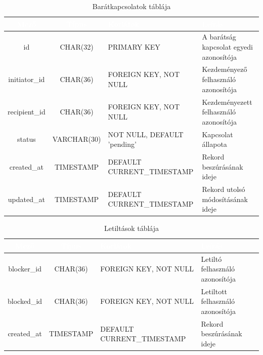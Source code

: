 \documentclass[12pt]{report}
\begin{document}
\begin{table}[h!]
    \centering
    \renewcommand{\arraystretch}{1.5}  %
    \begin{tabularx}{\textwidth}{|c|c|>{\raggedright\arraybackslash}X|>{\raggedright\arraybackslash}X|}  %
        \hline
        \rowcolor{gray!30} \textcolor{white}{\textbf{Mező}} & \textcolor{white}{\textbf{Típus}} & \textcolor{white}{\textbf{Korlátok}} & \textcolor{white}{\textbf{Leírás}} \\
        \hline
        id & CHAR(32) & PRIMARY KEY & A barátság kapcsolat egyedi azonosítója \\
        \hline
        initiator\_id & CHAR(36) & FOREIGN KEY, NOT NULL & Kezdeményező felhasználó azonosítója \\
        \hline
        recipient\_id & CHAR(36) & FOREIGN KEY, NOT NULL & Kezdeményezett felhasználó azonosítója \\
        \hline
        status & VARCHAR(30) & NOT NULL, DEFAULT 'pending' & Kapcsolat állapota \\
        \hline
        created\_at & TIMESTAMP & DEFAULT CURRENT\_TIMESTAMP & Rekord beszúrásának ideje \\
        \hline
        updated\_at & TIMESTAMP & DEFAULT CURRENT\_TIMESTAMP & Rekord utolsó módosításának ideje \\
        \hline
    \end{tabularx}
    \caption{Barátkapcsolatok táblája}
    \label{tab:friends}
\end{table}

\begin{table}[h!]
    \centering
    \renewcommand{\arraystretch}{1.5}  %
    \begin{tabularx}{\textwidth}{|c|c|>{\raggedright\arraybackslash}X|>{\raggedright\arraybackslash}X|}  %
        \hline
        \rowcolor{gray!30} \textcolor{white}{\textbf{Mező}} & \textcolor{white}{\textbf{Típus}} & \textcolor{white}{\textbf{Korlátok}} & \textcolor{white}{\textbf{Leírás}} \\
        \hline
        blocker\_id & CHAR(36) & FOREIGN KEY, NOT NULL & Letiltó felhasználó azonosítója \\
        \hline
        blocked\_id & CHAR(36) & FOREIGN KEY, NOT NULL & Letiltott felhasználó azonosítója \\
        \hline
        created\_at & TIMESTAMP & DEFAULT CURRENT\_TIMESTAMP & Rekord beszúrásának ideje \\
        \hline
    \end{tabularx}
    \caption{Letiltások táblája}
    \label{tab:blocks}
\end{table}
\end{document}
